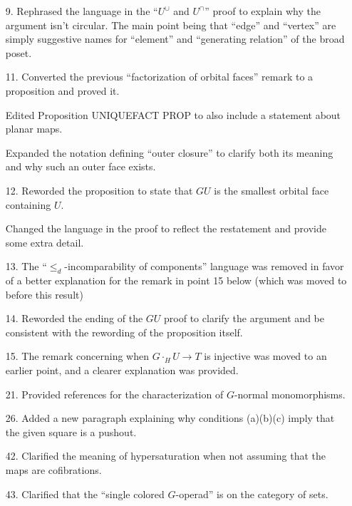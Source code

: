 \documentclass{article}
\begin{document}
\begin{itemize}
\item[9.] Rephrased the language in the ``$U^{\cup}$ and $U^{\cap}$'' proof to explain why the argument isn't circular. The main point being that ``edge'' and ``vertex'' are simply suggestive names for ``element'' and ``generating relation'' of the broad poset.


\item[11.] Converted the previous ``factorization of orbital faces'' remark to a proposition and proved it.

Edited Proposition UNIQUEFACT PROP to also include a statement about planar maps.

Expanded the notation defining ``outer closure'' to clarify both its meaning and why such an outer face exists.


\item[12.] Reworded the proposition to state that $GU$ is the smallest orbital face containing $U$.

Changed the language in the proof to reflect the restatement and provide some extra detail.


\item[13.] The ``$\leq_d$-incomparability of components'' language was removed in favor of a better explanation for the remark in point 15 below (which was moved to before this result)


\item[14.] Reworded the ending of the $GU$ proof to clarify the argument and be consistent with the rewording of the proposition itself.

\item[15.] The remark concerning when $G\cdot_H U \to T$ is injective was moved to an earlier point, and a clearer explanation was provided.

\item[21.] Provided references for the characterization of $G$-normal monomorphisms.
 

\item[26.] Added a new paragraph explaining why conditions (a)(b)(c) imply that the given square is a pushout.

\item[42.] Clarified the meaning of hypersaturation when not assuming that the maps are cofibrations.

\item[43.] Clarified that the ``single colored $G$-operad'' is on the category of sets.


\end{itemize}
\end{document}
